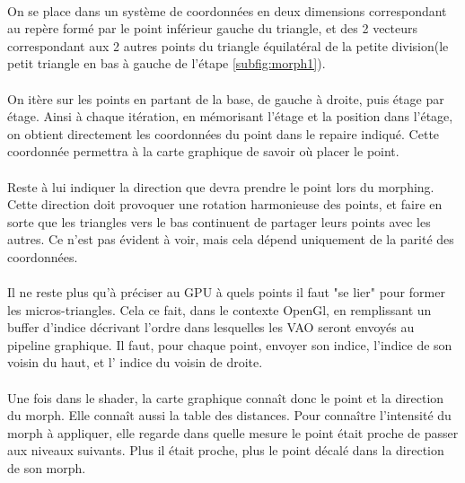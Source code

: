 	\paragraph{}
	On se place dans un système de coordonnées en deux dimensions correspondant au repère formé par le point inférieur gauche du triangle, et des 2 vecteurs correspondant aux 2 autres points du triangle équilatéral de la petite division(le petit triangle en bas à gauche de l'étape \ref{subfig:morph1}).
	\paragraph{}
	On itère sur les points en partant de la base, de gauche à droite, puis étage par étage. Ainsi à chaque itération, en mémorisant l'étage et la position dans l'étage, on obtient directement les coordonnées du point dans le repaire indiqué. Cette coordonnée permettra à la carte graphique de savoir où placer le point.
	\paragraph{}
	Reste à lui indiquer la direction que devra prendre le point lors du morphing. 
	Cette direction doit provoquer une rotation harmonieuse des points, et faire en sorte que les triangles vers le bas continuent de partager leurs points avec les autres. Ce n'est pas évident à voir, mais cela dépend uniquement de la parité des coordonnées. 
	\paragraph{}
	Il ne reste plus qu'à préciser au GPU à quels points il faut "se lier" pour former les micros-triangles. Cela ce fait, dans le contexte OpenGl, en remplissant un buffer d'indice décrivant l'ordre dans lesquelles les VAO seront envoyés au pipeline graphique. Il faut, pour chaque point, envoyer son indice, l'indice de son voisin du haut, et l' indice du voisin de droite.%
	\paragraph{}
	Une fois dans le shader, la carte graphique connaît donc le point et la direction du morph. Elle connaît aussi la table des distances. Pour connaître l'intensité du morph à appliquer, elle regarde dans quelle mesure le point était proche de passer aux niveaux suivants. Plus il était proche, plus le point décalé dans la direction de son morph.
	

